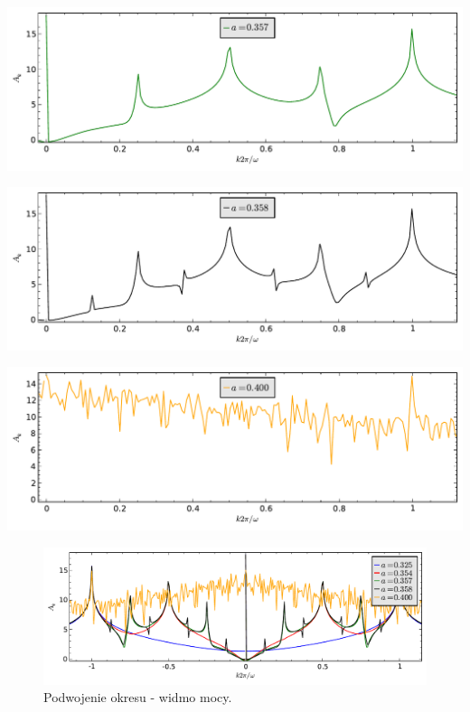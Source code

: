 \documentclass[a4paper,12pt,polish]{sphinxmanual}
\begin{document}
{\hfill\includegraphics[width=0.600\linewidth]{sage_chII012_02c.pdf}\hfill}

{\hfill\includegraphics[width=0.600\linewidth]{sage_chII012_02d.pdf}\hfill}

{\hfill\includegraphics[width=0.600\linewidth]{sage_chII012_02e.pdf}\hfill}
\begin{figure}[htbp]
\centering
\capstart

\includegraphics[width=0.600\linewidth]{sage_chII012_02.pdf}
\caption{Podwojenie okresu - widmo mocy.}\end{figure}
\end{document}
